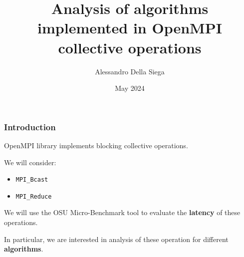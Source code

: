 \documentclass{beamer}
\title{Analysis of algorithms implemented in OpenMPI collective operations}
\author{Alessandro Della Siega}
\institute{University of Trieste}
\date{May 2024}
\begin{document}
\frame{\titlepage}


\begin{frame}
\frametitle{Introduction}
OpenMPI library implements blocking collective operations.

We will consider:
\begin{itemize}
    \item \texttt{MPI\_Bcast}
    \item \texttt{MPI\_Reduce}
\end{itemize}

We will use the OSU Micro-Benchmark tool to evaluate the \textbf{latency} of these operations.

In particular, we are interested in analysis of these operation for different \textbf{algorithms}.
\end{frame}
\end{document}
